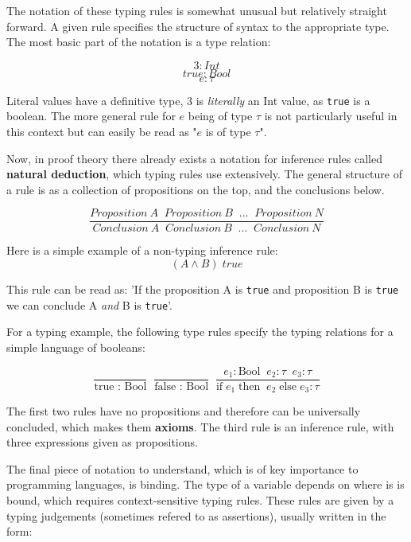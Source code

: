 \documentclass{l4proj}
\begin{document}
The notation of these typing rules is somewhat unusual but relatively straight forward.
A given rule specifies the structure of syntax to the appropriate type.
The most basic part of the notation is a type relation:

\[3 : Int\]
\[true : Bool\]
\[e : \tau\]

Literal values have a definitive type, $3$ is \emph{literally} an Int value, as \texttt{true} is a boolean.
The more general rule for $e$ being of type $\tau$ is not particularly useful in this context but can easily be read as "$e$ is of type $\tau$".

Now, in proof theory there already exists a notation for inference rules called \textbf{natural deduction}, which typing rules use extensively.
The general structure of a rule is as a collection of propositions on the top, and the conclusions below.

\begin{equation} \label{eq:inference-syntax-example}
\frac{Proposition\: A \;\; Proposition\: B \;\; ... \;\; Proposition\: N}{Conclusion\: A \;\; Conclusion\: B \;\; ... \;\; Conclusion\: N}
\end{equation}

Here is a simple example of a non-typing inference rule:
\begin{equation} \label{eq:inference-example}
{(A \wedge B) \; true}
\end{equation}

This rule can be read as: 'If the proposition A is \texttt{true} and proposition B is \texttt{true} we can conclude A \emph{and} B is \texttt{true}'.

For a typing example, the following type rules specify the typing relations for a simple language of booleans:

\begin{equation} \label{eq:boolean-type-rules}
\frac{}{\text{true : Bool}} \;\; \frac{}{\text{false : Bool}} \;\; \frac{e_1 :\text{Bool} \;\; e_2 : \tau \;\; e_3 : \tau}{\text{if}\; e_1 \;\text{then} \;\; e_2 \; \text{else} \; e_3 : \tau}
\end{equation}

The first two rules have no propositions and therefore can be universally concluded, which makes them \textbf{axioms}.
The third rule is an inference rule, with three expressions given as propositions.

The final piece of notation to understand, which is of key importance to programming languages, is binding.
The type of a variable depends on where is is bound, which requires context-sensitive typing rules.
These rules are given by a typing judgements (sometimes refered to as assertions), usually written in the form:
\end{document}
